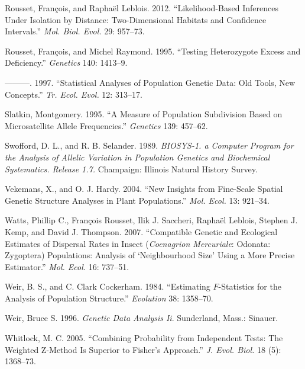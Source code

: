 \documentclass[12pt,]{book}
\begin{document}
\hypertarget{ref-RoussetL12}{}
Rousset, François, and Raphaël Leblois. 2012. ``Likelihood-Based
Inferences Under Isolation by Distance: Two-Dimensional Habitats and
Confidence Intervals.'' \emph{Mol. Biol. Evol.} 29: 957--73.

\hypertarget{ref-RoussetR95}{}
Rousset, François, and Michel Raymond. 1995. ``Testing Heterozygote
Excess and Deficiency.'' \emph{Genetics} 140: 1413--9.

\hypertarget{ref-RoussetR97}{}
---------. 1997. ``Statistical Analyses of Population Genetic Data: Old
Tools, New Concepts.'' \emph{Tr. Ecol. Evol.} 12: 313--17.

\hypertarget{ref-Slatkin95}{}
Slatkin, Montgomery. 1995. ``A Measure of Population Subdivision Based
on Microsatellite Allele Frequencies.'' \emph{Genetics} 139: 457--62.

\hypertarget{ref-SwoffordS89}{}
Swofford, D. L., and R. B. Selander. 1989. \emph{BIOSYS-1. a Computer
Program for the Analysis of Allelic Variation in Population Genetics and
Biochemical Systematics. Release 1.7.} Champaign: Illinois Natural
History Survey.

\hypertarget{ref-VekemansH04}{}
Vekemans, X., and O. J. Hardy. 2004. ``New Insights from Fine-Scale
Spatial Genetic Structure Analyses in Plant Populations.'' \emph{Mol.
Ecol.} 13: 921--34.

\hypertarget{ref-WattsX07}{}
Watts, Phillip C., François Rousset, Ilik J. Saccheri, Raphaël Leblois,
Stephen J. Kemp, and David J. Thompson. 2007. ``Compatible Genetic and
Ecological Estimates of Dispersal Rates in Insect (\emph{Coenagrion
Mercuriale}: Odonata: Zygoptera) Populations: Analysis of `Neighbourhood
Size' Using a More Precise Estimator.'' \emph{Mol. Ecol.} 16: 737--51.

\hypertarget{ref-WeirC84}{}
Weir, B. S., and C. Clark Cockerham. 1984. ``Estimating \(F\)-Statistics
for the Analysis of Population Structure.'' \emph{Evolution} 38:
1358--70.

\hypertarget{ref-WeirbkII}{}
Weir, Bruce S. 1996. \emph{Genetic Data Analysis Ii}. Sunderland, Mass.:
Sinauer.

\hypertarget{ref-Whitlock05}{}
Whitlock, M. C. 2005. ``Combining Probability from Independent Tests:
The Weighted Z-Method Is Superior to Fisher's Approach.'' \emph{J. Evol.
Biol.} 18 (5): 1368--73.
\end{document}
